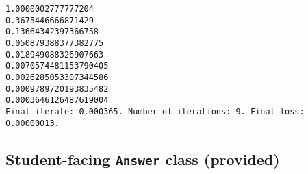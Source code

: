 \documentclass[11pt]{article}
\begin{document}
    \begin{Verbatim}[commandchars=\\\{\}]
1.0000002777777204
0.3675446666871429
0.13664342397366758
0.050879388377382775
0.018949088326907663
0.0070574481153790405
0.0026285053307344586
0.0009789720193835482
0.0003646126487619004
Final iterate: 0.000365. Number of iterations: 9. Final loss: 0.00000013.

    \end{Verbatim}

    \subsection{\texorpdfstring{{Student-facing \texttt{Answer} class
(provided)}}{Student-facing Answer class (provided)}}\label{student-facing-answer-class-provided}
\end{document}
